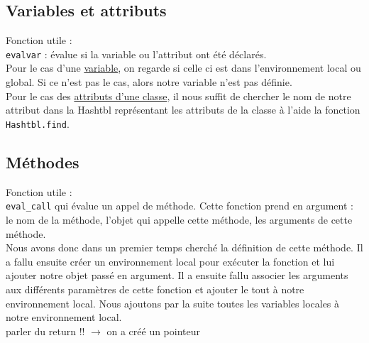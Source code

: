\documentclass{article}
\begin{document}
\subsection{Variables et attributs}
Fonction utile : \\
\texttt{evalvar} : évalue si la variable ou l'attribut ont été déclarés.\\
Pour le cas d'une \underline{variable}, on regarde si celle ci est dans l'environnement local ou global. Si ce n'est pas le cas, alors notre variable n'est pas définie.\\
Pour le cas des \underline{attributs d'une classe}, il nous suffit de chercher le nom de notre attribut dans la Hashtbl représentant les attributs de la classe à l'aide la fonction \texttt{Hashtbl.find}.
\subsection{Méthodes}
Fonction utile : \\
\texttt{eval\_call} qui évalue un appel de méthode. Cette fonction prend en argument : le nom de la méthode, l'objet qui appelle cette méthode, les arguments de cette méthode.\\
Nous avons donc dans un premier temps cherché la définition de cette méthode. Il a fallu ensuite créer un environnement local pour exécuter la fonction et lui ajouter notre objet passé en argument. Il a ensuite fallu associer les arguments aux différents paramètres de cette fonction et ajouter le tout à notre environnement local. Nous ajoutons par la suite toutes les variables locales à notre environnement local.
\\parler du return !! $\rightarrow$ on a créé un pointeur
\end{document}
